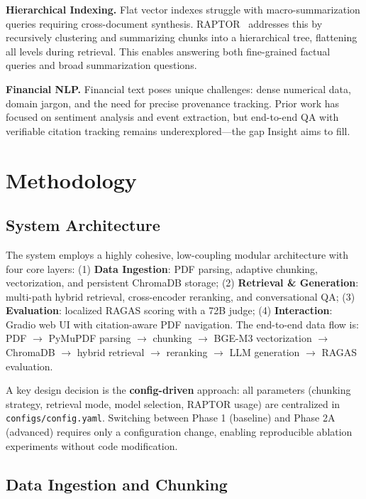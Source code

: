 \documentclass[11pt, a4paper]{article}
\begin{document}
\noindent\textbf{Hierarchical Indexing.} Flat vector indexes struggle with macro-summarization queries requiring cross-document synthesis. RAPTOR~\cite{raptor} addresses this by recursively clustering and summarizing chunks into a hierarchical tree, flattening all levels during retrieval. This enables answering both fine-grained factual queries and broad summarization questions.

\noindent\textbf{Financial NLP.} Financial text poses unique challenges: dense numerical data, domain jargon, and the need for precise provenance tracking. Prior work has focused on sentiment analysis and event extraction, but end-to-end QA with verifiable citation tracking remains underexplored---the gap Insight aims to fill.

\section{Methodology}

\subsection{System Architecture}

The system employs a highly cohesive, low-coupling modular architecture with
four core layers: (1) \textbf{Data Ingestion}: PDF parsing, adaptive chunking,
vectorization, and persistent ChromaDB storage; (2) \textbf{Retrieval \&
    Generation}: multi-path hybrid retrieval, cross-encoder reranking, and
conversational QA; (3) \textbf{Evaluation}: localized RAGAS scoring with a 72B
judge; (4) \textbf{Interaction}: Gradio web UI with citation-aware PDF
navigation. The end-to-end data flow is: PDF $\rightarrow$ PyMuPDF parsing
$\rightarrow$ chunking $\rightarrow$ BGE-M3 vectorization $\rightarrow$
ChromaDB $\rightarrow$ hybrid retrieval $\rightarrow$ reranking $\rightarrow$
LLM generation $\rightarrow$ RAGAS evaluation.

A key design decision is the \textbf{config-driven} approach: all parameters
(chunking strategy, retrieval mode, model selection, RAPTOR usage) are
centralized in \texttt{configs/config.yaml}. Switching between Phase 1
(baseline) and Phase 2A (advanced) requires only a configuration change,
enabling reproducible ablation experiments without code modification.

\subsection{Data Ingestion and Chunking}
\end{document}
